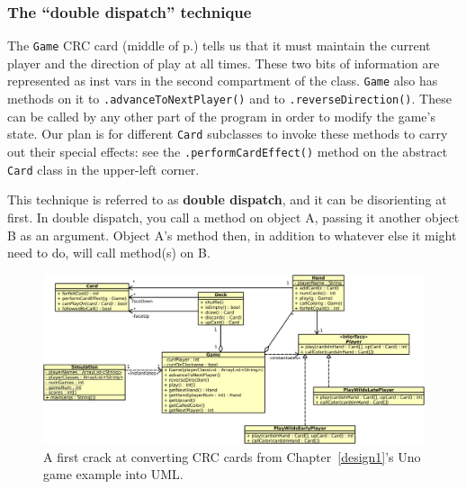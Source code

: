 \subsubsection{The ``double dispatch'' technique}

The \texttt{Game} CRC card (middle of p.\pageref{unoCRC2}) tells us that it
must maintain the current player and the direction of play at all times. These
two bits of information are represented as inst vars in the second compartment
of the class. \texttt{Game} also has methods on it to
\texttt{.advanceToNextPlayer()} and to \texttt{.reverseDirection()}. These can
be called by any other part of the program in order to modify the game's state.
Our plan is for different \texttt{Card} subclasses to invoke these methods to
carry out their special effects: see the \texttt{.performCardEffect()} method
on the abstract \texttt{Card} class in the upper-left corner.

This technique is referred to as \textbf{double dispatch}, and it can be
disorienting at first. In double dispatch, you call a method on object A,
passing it another object B as an argument. Object A's method then, in addition
to whatever else it might need to do, will call method(s) on B.

\begin{figure}[ht]
\centering
\includegraphics[width=1\textwidth]{UnoClassDiagram.png}
\medskip
\caption{A first crack at converting CRC cards from Chapter~\ref{design1}'s
Uno game example into UML.}
\label{fig:unoClassDiag}
\end{figure}

